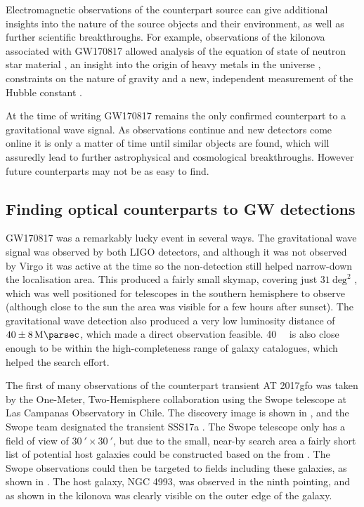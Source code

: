 \begin{colsection}
\begin{colsection}
Electromagnetic observations of the counterpart source can give additional insights into the nature of the source objects and their environment, as well as further scientific breakthroughs. For example, observations of the kilonova associated with GW170817 \citep{GW170817, GW170817_followup} allowed analysis of the equation of state of neutron star material \citep{GW170817_NSscience}, an insight into the origin of heavy metals in the universe \citep{GW170818_heavy}, constraints on the nature of gravity \citep{GW170817_gravity} and a new, independent measurement of the Hubble constant \citep{GW170817_hubble}.

At the time of writing GW170817 remains the only confirmed counterpart to a gravitational wave signal. As observations continue and new detectors come online it is only a matter of time until similar objects are found, which will assuredly lead to further astrophysical and cosmological breakthroughs. However future counterparts may not be as easy to find.

\end{colsection}


\subsection{Finding optical counterparts to GW detections}
\label{sec:followup}
\begin{colsection}

GW170817 was a remarkably lucky event in several ways. The gravitational wave signal was observed by both LIGO detectors, and although it was not observed by Virgo it was active at the time so the non-detection still helped narrow-down the localisation area. This produced a fairly small skymap, covering just $31~\text{deg}^2$ \citep[see ]{GW170817}, which was well positioned for telescopes in the southern hemisphere to observe (although close to the sun the area was visible for a few hours after sunset). The gravitational wave detection also produced a very low luminosity distance of $40\pm\SI{8}{\mega\parsec}$, which made a direct observation feasible. \SI{40}{\mega\parsec} is also close enough to be within the high-completeness range of galaxy catalogues, which helped the search effort.

The first of many observations of the counterpart transient AT 2017gfo was taken by the One-Meter, Two-Hemisphere collaboration using the Swope telescope at Las Campanas Observatory in Chile. The discovery image is shown in , and the Swope team designated the transient SSS17a \citep{GW170817_Swope}. The Swope telescope only has a field of view of $\SI{30}{\arcmin}\times\SI{30}{\arcmin}$, but due to the small, near-by search area a fairly short list of potential host galaxies could be constructed based on the  from \citet{GWGC}. The Swope observations could then be targeted to fields including these galaxies, as shown in . The host galaxy, NGC 4993, was observed in the ninth pointing, and as shown in  the kilonova was clearly visible on the outer edge of the galaxy.


\end{colsection}
\end{colsection}
